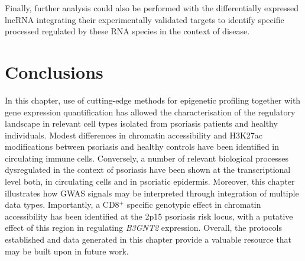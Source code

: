 Finally, further analysis could also be performed with the differentially expressed lncRNA integrating their experimentally validated targets to identify specific processed regulated by these RNA species in the context of disease. %

\section{Conclusions}
In this chapter, use of cutting-edge methods for epigenetic profiling together with gene expression quantification has allowed the characterisation of the regulatory landscape in relevant cell types isolated from psoriasis patients and healthy individuals. Modest differences in chromatin accessibility and H3K27ac modifications between psoriasis and healthy controls have been identified in circulating immune cells. Conversely, a number of relevant biological processes dysregulated in the context of psoriasis have been shown at the transcriptional level both, in circulating cells and in psoriatic epidermis. Moreover, this chapter illustrates how GWAS signals may be interpreted through integration of multiple data types. Importantly,  a CD8$^+$ specific genotypic effect in chromatin accessibility has been identified at the 2p15 psoriasis risk locus, with a putative effect of this region in regulating \textit{B3GNT2} expression. Overall, the protocols established and data generated in this chapter provide a valuable resource that may be built upon in future work.



